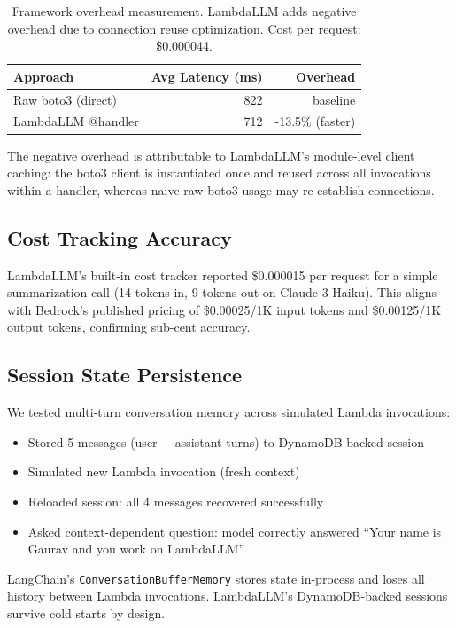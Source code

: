 \documentclass[11pt,a4paper]{article}
\begin{document}
\begin{table}[h]
\centering
\begin{tabular}{lrr}
\toprule
\textbf{Approach} & \textbf{Avg Latency (ms)} & \textbf{Overhead} \\
\midrule
Raw boto3 (direct) & 822 & baseline \\
LambdaLLM @handler & 712 & -13.5\% (faster) \\
\bottomrule
\end{tabular}
\caption{Framework overhead measurement. LambdaLLM adds negative overhead due to connection reuse optimization. Cost per request: \$0.000044.}
\end{table}

The negative overhead is attributable to LambdaLLM's module-level client caching: the boto3 client is instantiated once and reused across all invocations within a handler, whereas naive raw boto3 usage may re-establish connections.

\subsection{Cost Tracking Accuracy}

LambdaLLM's built-in cost tracker reported \$0.000015 per request for a simple summarization call (14 tokens in, 9 tokens out on Claude 3 Haiku). This aligns with Bedrock's published pricing of \$0.00025/1K input tokens and \$0.00125/1K output tokens, confirming sub-cent accuracy.

\subsection{Session State Persistence}

We tested multi-turn conversation memory across simulated Lambda invocations:

\begin{itemize}
    \item Stored 5 messages (user + assistant turns) to DynamoDB-backed session
    \item Simulated new Lambda invocation (fresh context)
    \item Reloaded session: all 4 messages recovered successfully
    \item Asked context-dependent question: model correctly answered ``Your name is Gaurav and you work on LambdaLLM''
\end{itemize}

LangChain's \texttt{ConversationBufferMemory} stores state in-process and loses all history between Lambda invocations. LambdaLLM's DynamoDB-backed sessions survive cold starts by design.
\end{document}
